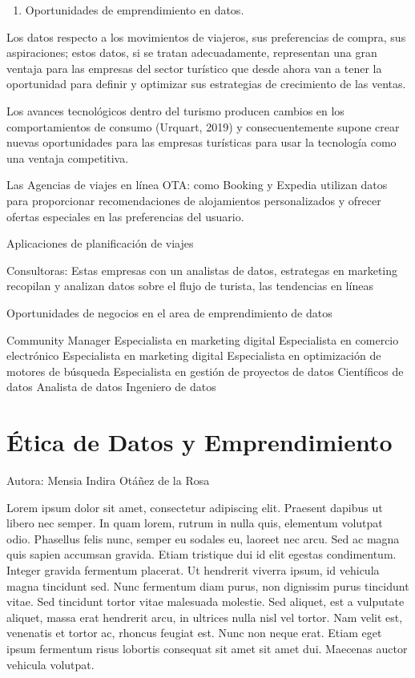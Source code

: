 \documentclass[
  letterpaper,
  DIV=11,
  numbers=noendperiod]{scrreprt}
\providecommand{\tightlist}{%
  \setlength{\itemsep}{0pt}\setlength{\parskip}{0pt}}\usepackage{longtable,booktabs,array}
\begin{document}
\begin{enumerate}
\def\labelenumi{\arabic{enumi}.}
\setcounter{enumi}{6}
\tightlist
\item
  Oportunidades de emprendimiento en datos.
\end{enumerate}

Los datos respecto a los movimientos de viajeros, sus preferencias de
compra, sus aspiraciones; estos datos, si se tratan adecuadamente,
representan una gran ventaja para las empresas del sector turístico que
desde ahora van a tener la oportunidad para definir y optimizar sus
estrategias de crecimiento de las ventas.

Los avances tecnológicos dentro del turismo producen cambios en los
comportamientos de consumo (Urquart, 2019) y consecuentemente supone
crear nuevas oportunidades para las empresas turísticas para usar la
tecnología como una ventaja competitiva.

Las Agencias de viajes en línea OTA: como Booking y Expedia utilizan
datos para proporcionar recomendaciones de alojamientos personalizados y
ofrecer ofertas especiales en las preferencias del usuario.

Aplicaciones de planificación de viajes

Consultoras: Estas empresas con un analistas de datos, estrategas en
marketing recopilan y analizan datos sobre el flujo de turista, las
tendencias en líneas

Oportunidades de negocios en el area de emprendimiento de datos

Community Manager Especialista en marketing digital Especialista en
comercio electrónico Especialista en marketing digital Especialista en
optimización de motores de búsqueda Especialista en gestión de proyectos
de datos Científicos de datos Analista de datos Ingeniero de datos


\hypertarget{uxe9tica-de-datos-y-emprendimiento}{%
\chapter{Ética de Datos y
Emprendimiento}\label{uxe9tica-de-datos-y-emprendimiento}}

Autora: Mensia Indira Otáñez de la Rosa

Lorem ipsum dolor sit amet, consectetur adipiscing elit. Praesent
dapibus ut libero nec semper. In quam lorem, rutrum in nulla quis,
elementum volutpat odio. Phasellus felis nunc, semper eu sodales eu,
laoreet nec arcu. Sed ac magna quis sapien accumsan gravida. Etiam
tristique dui id elit egestas condimentum. Integer gravida fermentum
placerat. Ut hendrerit viverra ipsum, id vehicula magna tincidunt sed.
Nunc fermentum diam purus, non dignissim purus tincidunt vitae. Sed
tincidunt tortor vitae malesuada molestie. Sed aliquet, est a vulputate
aliquet, massa erat hendrerit arcu, in ultrices nulla nisl vel tortor.
Nam velit est, venenatis et tortor ac, rhoncus feugiat est. Nunc non
neque erat. Etiam eget ipsum fermentum risus lobortis consequat sit amet
sit amet dui. Maecenas auctor vehicula volutpat.
\end{document}

